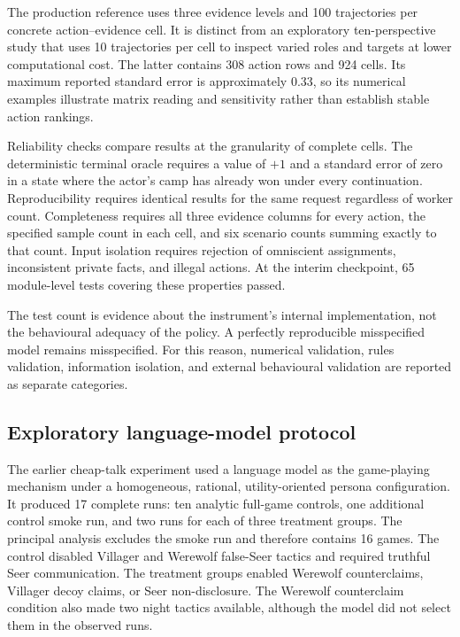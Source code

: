 \documentclass[11pt,a4paper]{article}
\begin{document}
The production reference uses three evidence levels and 100 trajectories per concrete action--evidence cell. It is distinct from an exploratory ten-perspective study that uses 10 trajectories per cell to inspect varied roles and targets at lower computational cost. The latter contains 308 action rows and 924 cells. Its maximum reported standard error is approximately 0.33, so its numerical examples illustrate matrix reading and sensitivity rather than establish stable action rankings.

Reliability checks compare results at the granularity of complete cells. The deterministic terminal oracle requires a value of $+1$ and a standard error of zero in a state where the actor's camp has already won under every continuation. Reproducibility requires identical results for the same request regardless of worker count. Completeness requires all three evidence columns for every action, the specified sample count in each cell, and six scenario counts summing exactly to that count. Input isolation requires rejection of omniscient assignments, inconsistent private facts, and illegal actions. At the interim checkpoint, 65 module-level tests covering these properties passed.

The test count is evidence about the instrument's internal implementation, not the behavioural adequacy of the policy. A perfectly reproducible misspecified model remains misspecified. For this reason, numerical validation, rules validation, information isolation, and external behavioural validation are reported as separate categories.

\subsection{Exploratory language-model protocol}

The earlier cheap-talk experiment used a language model as the game-playing mechanism under a homogeneous, rational, utility-oriented persona configuration. It produced 17 complete runs: ten analytic full-game controls, one additional control smoke run, and two runs for each of three treatment groups. The principal analysis excludes the smoke run and therefore contains 16 games. The control disabled Villager and Werewolf false-Seer tactics and required truthful Seer communication. The treatment groups enabled Werewolf counterclaims, Villager decoy claims, or Seer non-disclosure. The Werewolf counterclaim condition also made two night tactics available, although the model did not select them in the observed runs.
\end{document}
